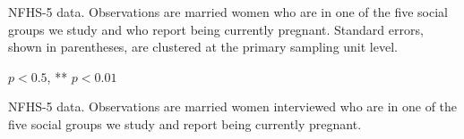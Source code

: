 \documentclass[12pt]{article}
\begin{document}
\begin{table}[H]

\begin{threeparttable}
    
    \centering
    \scriptsize %
    
    \caption{: Women reporting one or two months of pregnancy are different than those reporting three or more months of pregnancy}
    \label{regression3plusmopreg}
    \setlength{\tabcolsep}{1pt}
    \renewcommand{\arraystretch}{1.7}
    {}
    \begin{tablenotes}
        \item NFHS-5 data. Observations are married women who are in one of the five social groups we study and who report being currently pregnant. Standard errors, shown in parentheses, are clustered at the primary sampling unit level. 
        \item * $p<0.5$, ** $p<0.01$
    \end{tablenotes}
\end{threeparttable}
\end{table}




\newpage

\begin{table}[H]
    \centering

    \begin{threeparttable}
            
    \caption{: Distribution of gestational ages suggests under-reporting of early pregnancy}
    \label{gestdur_distribution}
    \small
    \renewcommand{\arraystretch}{1.7}
    \setlength{\tabcolsep}{5pt}
    
        
    
    \small
    \begin{tablenotes}
        \item  
    \end{tablenotes}

    \begin{tablenotes}
    \footnotesize
    \item 
        NFHS-5 data. Observations are married women interviewed who are in one of the five social groups we study and report being currently pregnant.
    \end{tablenotes}
    
    \end{threeparttable}
\end{table}
\end{document}
